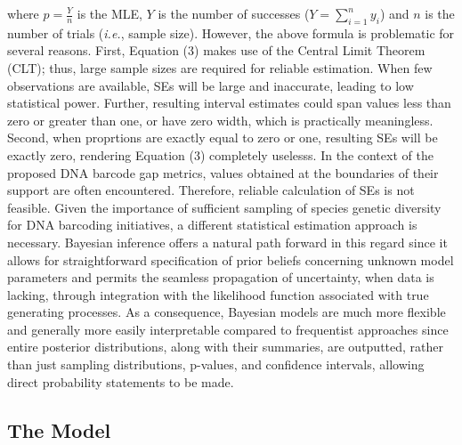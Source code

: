 \documentclass[12pt]{article}
\begin{document}
\noindent where $\hat{p} = \frac{Y}{n}$ is the MLE, $Y$ is the number of successes ($Y = \sum_{i=1}^n{y_i}$) and $n$ is the number of trials (\textit{i.e.}, sample size). However, the above formula is problematic for several reasons. First, Equation (3) makes use of the Central Limit Theorem (CLT); thus, large sample sizes are required for reliable estimation. When few observations are available, SEs will be large and inaccurate, leading to low statistical power. Further, resulting interval estimates could span values less than zero or greater than one, or have zero width, which is practically meaningless. Second, when proprtions are exactly equal to zero or one, resulting SEs will be exactly zero, rendering Equation (3) completely uselesss. In the context of the proposed DNA barcode gap metrics, values obtained at the boundaries of their support are often encountered. Therefore, reliable calculation of SEs is not feasible. Given the importance of sufficient sampling of species genetic diversity for DNA barcoding initiatives, a different statistical estimation approach is necessary. Bayesian inference offers a natural path forward in this regard since it allows for straightforward specification of prior beliefs concerning unknown model parameters and permits the seamless propagation of uncertainty, when data is lacking, through integration with the likelihood function associated with true generating processes. As a consequence, Bayesian models are much more flexible and generally more easily interpretable compared to frequentist approaches since entire posterior distributions, along with their summaries, are outputted, rather than just sampling distributions, p-values, and confidence intervals, allowing direct probability statements to be made. 

\subsection{The Model}
\end{document}
